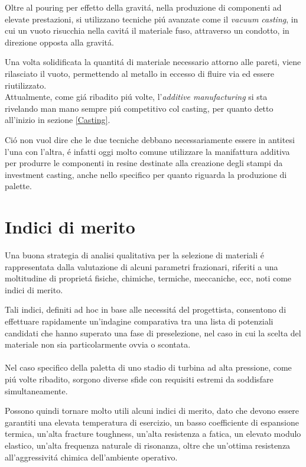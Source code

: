\documentclass{article}
\begin{document}
        Oltre al pouring per effetto della gravitá, nella 
        produzione di componenti ad 
        elevate prestazioni, si utilizzano tecniche piú avanzate come il 
        \textit{vacuum casting}, in cui un vuoto risucchia nella cavitá
        il materiale fuso, attraverso un condotto, in direzione opposta alla gravitá. 

        Una volta solidificata la quantitá di materiale necessario attorno alle pareti,
        viene rilasciato il vuoto, permettendo al metallo in eccesso di fluire via ed essere riutilizzato. \\ 


        Attualmente, come giá ribadito piú volte, l'\textit{additive manufacturing} si sta rivelando
        man mano sempre piú competitivo col casting, per quanto detto all'inizio in sezione \ref{Casting}. 

        Ció non vuol dire che le due tecniche debbano necessariamente essere in antitesi l'una con l'altra, é 
        infatti oggi molto comune utilizzare la manifattura additiva per produrre le componenti in resine 
        destinate alla creazione degli stampi da investment casting, anche nello specifico per quanto riguarda la produzione
        di palette. 


        \clearpage


    \section{Indici di merito\label{material_index}}


        Una buona strategia di analisi qualitativa per la selezione di materiali é rappresentata dalla valutazione di alcuni parametri frazionari, riferiti a una moltitudine di proprietá fisiche, chimiche, termiche, meccaniche, ecc, noti come indici di merito.
        
        Tali indici, definiti ad hoc in base alle necessitá del progettista, consentono di effettuare rapidamente un’indagine comparativa tra una lista di potenziali candidati che hanno superato una fase di preselezione, nel caso in cui la scelta del materiale non sia particolarmente ovvia o scontata. 
        \\ \\
        Nel caso specifico della paletta di uno stadio di turbina ad alta pressione, come piú volte ribadito, sorgono diverse sfide con requisiti estremi da soddisfare simultaneamente.

        Possono quindi tornare molto utili alcuni indici di merito, dato che devono essere garantiti una elevata temperatura di esercizio, un basso coefficiente di espansione termica, un’alta fracture toughness, un’alta resistenza a fatica, un elevato modulo elastico, un’alta frequenza naturale di risonanza, oltre che un’ottima resistenza all’aggressivitá chimica dell’ambiente operativo. 
        
\end{document}
